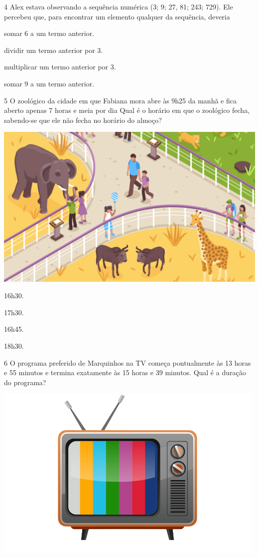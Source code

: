 \num{4} Alex estava observando a sequência numérica (3; 9; 27, 81; 243; 729).
Ele percebeu que, para encontrar um elemento qualquer da sequência,
deveria

\begin{escolha}
\item
  somar 6 a um termo anterior.
\item
  dividir um termo anterior por 3.
\item
  multiplicar um termo anterior por 3.
\item
  somar 9 a um termo anterior.
\end{escolha}


\num{5} O zoológico da cidade em que Fabiana mora abre às 9h25 da manhã e fica
aberto apenas 7 horas e meia por dia Qual é o horário em que o zoológico
fecha, sabendo-se que ele não fecha no horário do almoço?

\vspace{2em}
\includegraphics[width=\textwidth]{media/image83a.jpeg}

\begin{multicols}{2}
\begin{escolha}
\item
  16h30.
\item
  17h30.
\item
  16h45.
\item
  18h30.
\end{escolha}
\end{multicols}

\num{6} O programa preferido de Marquinhos na TV começa pontualmente às 13
horas e 55 minutos e termina exatamente às 15 horas e 39 minutos. Qual é a
duração do programa?

\includegraphics[width=.6\textwidth]{media/image83b.png}

